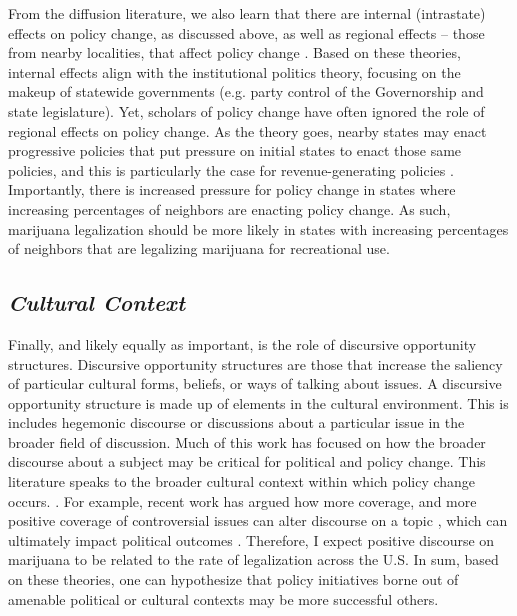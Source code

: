 From the diffusion literature, we also learn that there are internal (intrastate) effects on policy change, as discussed above, as well as regional effects  -- those from nearby localities, that affect policy change \citep{bradford_and_bradford_2017,berry_and_berry_1990,glick_and_friedland_2014}. Based on these theories, internal effects align with the institutional politics theory, focusing on the makeup of statewide governments (e.g. party control of the Governorship and state legislature). Yet, scholars of policy change have often ignored the role of regional effects on policy change. As the theory goes, nearby states may enact progressive policies that put pressure on initial states to enact those same policies, and this is particularly the case for revenue-generating policies \citep{bradford_and_bradford_2017,berry_and_berry_1990}. Importantly, there is increased pressure for policy change in states where increasing percentages of neighbors are enacting policy change.  As such, marijuana legalization should be more likely in states with increasing percentages of neighbors that are legalizing marijuana for recreational use. 


\subsection{\it{Cultural Context}}


Finally, and likely equally as important, is the role of discursive opportunity structures. Discursive opportunity structures are those that increase the saliency of particular cultural forms, beliefs, or ways of talking about issues. A discursive opportunity structure is made up of elements in the cultural environment. This is includes hegemonic discourse or discussions about a particular issue in the broader field of discussion. Much of this work has focused on how the broader discourse about a subject may be critical for political and policy change. This literature speaks to the broader cultural context within which policy change occurs. \citep{mccammon_et_al_2007,mccammon_et_al_2001}. For example, recent work has argued how more coverage, and more positive coverage of controversial issues \citep{amenta_et_al_2019,amenta_et_al_2009} can alter discourse on a topic \citep{bail_2012,ghaziani_and_baldassarri_2011}, which can ultimately impact political outcomes \citep{vasi_et_al_2015}. Therefore, I expect positive discourse on marijuana to be related to the rate of legalization across the U.S. In sum, based on these theories, one can hypothesize that policy initiatives borne out of amenable political or cultural contexts may be more successful others. 



